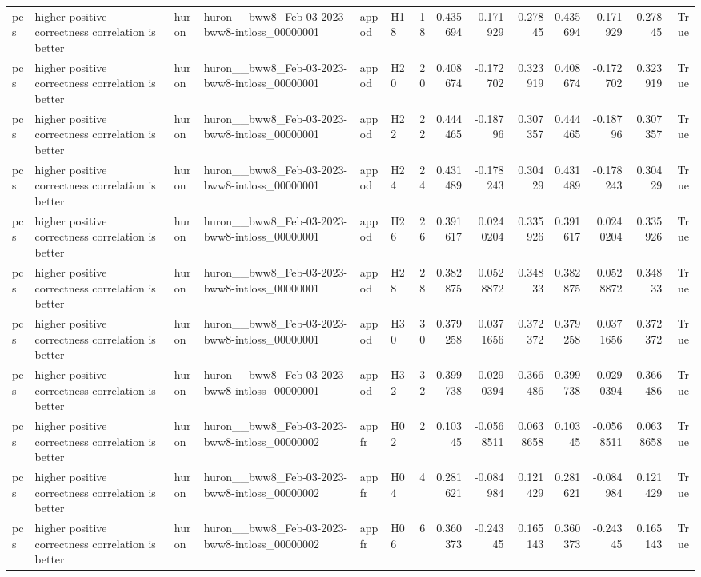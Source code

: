 \begin{longtable}{llllllrrrrrrrr}
pcs & higher positive correctness correlation is better & huron & huron\_\_bww8\_Feb-03-2023-bww8-intloss\_00000001 & appod & H18 & 18 & 0.435694 & -0.171929 & 0.27845 & 0.435694 & -0.171929 & 0.27845 & True \\
pcs & higher positive correctness correlation is better & huron & huron\_\_bww8\_Feb-03-2023-bww8-intloss\_00000001 & appod & H20 & 20 & 0.408674 & -0.172702 & 0.323919 & 0.408674 & -0.172702 & 0.323919 & True \\
pcs & higher positive correctness correlation is better & huron & huron\_\_bww8\_Feb-03-2023-bww8-intloss\_00000001 & appod & H22 & 22 & 0.444465 & -0.18796 & 0.307357 & 0.444465 & -0.18796 & 0.307357 & True \\
pcs & higher positive correctness correlation is better & huron & huron\_\_bww8\_Feb-03-2023-bww8-intloss\_00000001 & appod & H24 & 24 & 0.431489 & -0.178243 & 0.30429 & 0.431489 & -0.178243 & 0.30429 & True \\
pcs & higher positive correctness correlation is better & huron & huron\_\_bww8\_Feb-03-2023-bww8-intloss\_00000001 & appod & H26 & 26 & 0.391617 & 0.0240204 & 0.335926 & 0.391617 & 0.0240204 & 0.335926 & True \\
pcs & higher positive correctness correlation is better & huron & huron\_\_bww8\_Feb-03-2023-bww8-intloss\_00000001 & appod & H28 & 28 & 0.382875 & 0.0528872 & 0.34833 & 0.382875 & 0.0528872 & 0.34833 & True \\
pcs & higher positive correctness correlation is better & huron & huron\_\_bww8\_Feb-03-2023-bww8-intloss\_00000001 & appod & H30 & 30 & 0.379258 & 0.0371656 & 0.372372 & 0.379258 & 0.0371656 & 0.372372 & True \\
pcs & higher positive correctness correlation is better & huron & huron\_\_bww8\_Feb-03-2023-bww8-intloss\_00000001 & appod & H32 & 32 & 0.399738 & 0.0290394 & 0.366486 & 0.399738 & 0.0290394 & 0.366486 & True \\
pcs & higher positive correctness correlation is better & huron & huron\_\_bww8\_Feb-03-2023-bww8-intloss\_00000002 & appfr & H02 & 2 & 0.10345 & -0.0568511 & 0.0638658 & 0.10345 & -0.0568511 & 0.0638658 & True \\
pcs & higher positive correctness correlation is better & huron & huron\_\_bww8\_Feb-03-2023-bww8-intloss\_00000002 & appfr & H04 & 4 & 0.281621 & -0.084984 & 0.121429 & 0.281621 & -0.084984 & 0.121429 & True \\
pcs & higher positive correctness correlation is better & huron & huron\_\_bww8\_Feb-03-2023-bww8-intloss\_00000002 & appfr & H06 & 6 & 0.360373 & -0.24345 & 0.165143 & 0.360373 & -0.24345 & 0.165143 & True \\

\end{longtable}
